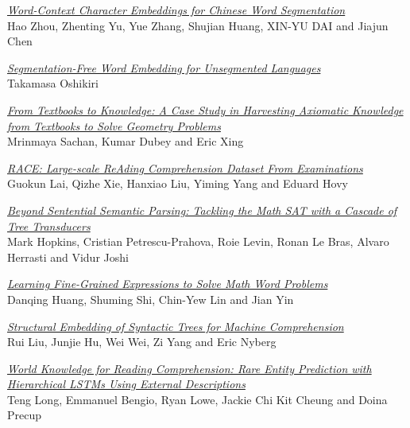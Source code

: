 \hyperlink{page.769}{\em Word-Context Character Embeddings for Chinese Word Segmentation}\samepage \\
\hspace*{7mm} Hao Zhou, Zhenting Yu, Yue Zhang, Shujian Huang, XIN-YU DAI and Jiajun Chen\dotfill {}

\hyperlink{page.776}{\em Segmentation-Free Word Embedding for Unsegmented Languages}\samepage \\
\hspace*{7mm} Takamasa Oshikiri\dotfill {}

\hyperlink{page.782}{\em From Textbooks to Knowledge: A Case Study in Harvesting Axiomatic Knowledge from Textbooks to Solve Geometry Problems}\samepage \\
\hspace*{7mm} Mrinmaya Sachan, Kumar Dubey and Eric Xing\dotfill {}

\hyperlink{page.794}{\em RACE: Large-scale ReAding Comprehension Dataset From Examinations}\samepage \\
\hspace*{7mm} Guokun Lai, Qizhe Xie, Hanxiao Liu, Yiming Yang and Eduard Hovy\dotfill {}

\hyperlink{page.804}{\em Beyond Sentential Semantic Parsing: Tackling the Math SAT with a Cascade of Tree Transducers}\samepage \\
\hspace*{7mm} Mark Hopkins, Cristian Petrescu-Prahova, Roie Levin, Ronan Le Bras, Alvaro Herrasti and Vidur Joshi\dotfill {}

\hyperlink{page.814}{\em Learning Fine-Grained Expressions to Solve Math Word Problems}\samepage \\
\hspace*{7mm} Danqing Huang, Shuming Shi, Chin-Yew Lin and Jian Yin\dotfill {}

\hyperlink{page.824}{\em Structural Embedding of Syntactic Trees for Machine Comprehension}\samepage \\
\hspace*{7mm} Rui Liu, Junjie Hu, Wei Wei, Zi Yang and Eric Nyberg\dotfill {}

\hyperlink{page.834}{\em World Knowledge for Reading Comprehension: Rare Entity Prediction with Hierarchical LSTMs Using External Descriptions}\samepage \\
\hspace*{7mm} Teng Long, Emmanuel Bengio, Ryan Lowe, Jackie Chi Kit Cheung and Doina Precup\dotfill {}

